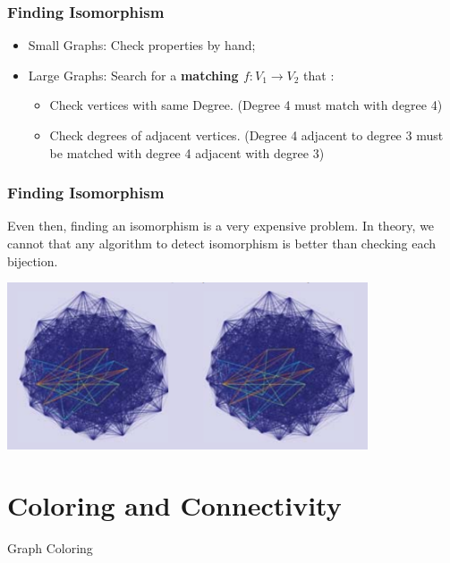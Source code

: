 \documentclass{beamer}
\begin{document}
\begin{frame}
  \frametitle{Finding Isomorphism}

  {\larger
    \begin{itemize}
    \item Small Graphs: Check properties by hand;
    \item Large Graphs: Search for a {\bf matching $f: V_1 \rightarrow V_2$}
      that :
      \begin{itemize}
      \item Check vertices with \alert{same Degree}. (Degree 4
        must match with degree 4)
      \item Check \alert{degrees of adjacent} vertices.
        (Degree 4 adjacent to degree 3 must be matched with
        degree 4 adjacent with degree 3) 
      \end{itemize}
    \end{itemize}
  }
\end{frame}

\begin{frame}
  \frametitle{Finding Isomorphism}

  {\larger
  
    Even then, finding an isomorphism is a very expensive problem.
    In theory, we cannot  that any algorithm
    to detect isomorphism is better than checking each bijection.

    \begin{center}
      \includegraphics[width=0.8\textwidth]{../img/isomorphism}
    \end{center}
  }
\end{frame}


\section{Coloring and Connectivity}

\begin{frame}
  \begin{center}
    {\huge
      Graph Coloring
    }
  \end{center}
\end{frame}
\end{document}

